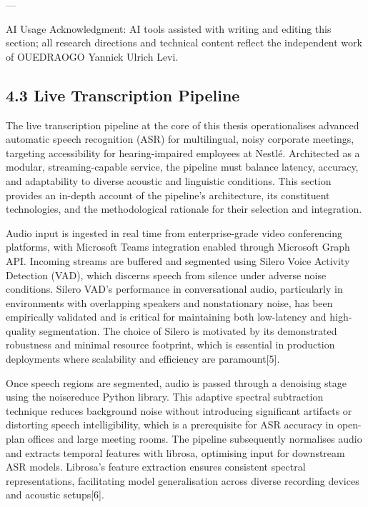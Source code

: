 \documentclass[12pt,a4paper]{article}
\begin{document}
---


AI Usage Acknowledgment: AI tools assisted with writing and editing this section; all research directions and technical content reflect the independent work of OUEDRAOGO Yannick Ulrich Levi.


\subsection{4.3 Live Transcription Pipeline}


The live transcription pipeline at the core of this thesis operationalises advanced automatic speech recognition (ASR) for multilingual, noisy corporate meetings, targeting accessibility for hearing-impaired employees at Nestlé. Architected as a modular, streaming-capable service, the pipeline must balance latency, accuracy, and adaptability to diverse acoustic and linguistic conditions. This section provides an in-depth account of the pipeline’s architecture, its constituent technologies, and the methodological rationale for their selection and integration.


Audio input is ingested in real time from enterprise-grade video conferencing platforms, with Microsoft Teams integration enabled through Microsoft Graph API. Incoming streams are buffered and segmented using Silero Voice Activity Detection (VAD), which discerns speech from silence under adverse noise conditions. Silero VAD’s performance in conversational audio, particularly in environments with overlapping speakers and nonstationary noise, has been empirically validated and is critical for maintaining both low-latency and high-quality segmentation. The choice of Silero is motivated by its demonstrated robustness and minimal resource footprint, which is essential in production deployments where scalability and efficiency are paramount[5].


Once speech regions are segmented, audio is passed through a denoising stage using the noisereduce Python library. This adaptive spectral subtraction technique reduces background noise without introducing significant artifacts or distorting speech intelligibility, which is a prerequisite for ASR accuracy in open-plan offices and large meeting rooms. The pipeline subsequently normalises audio and extracts temporal features with librosa, optimising input for downstream ASR models. Librosa’s feature extraction ensures consistent spectral representations, facilitating model generalisation across diverse recording devices and acoustic setups[6].
\end{document}

